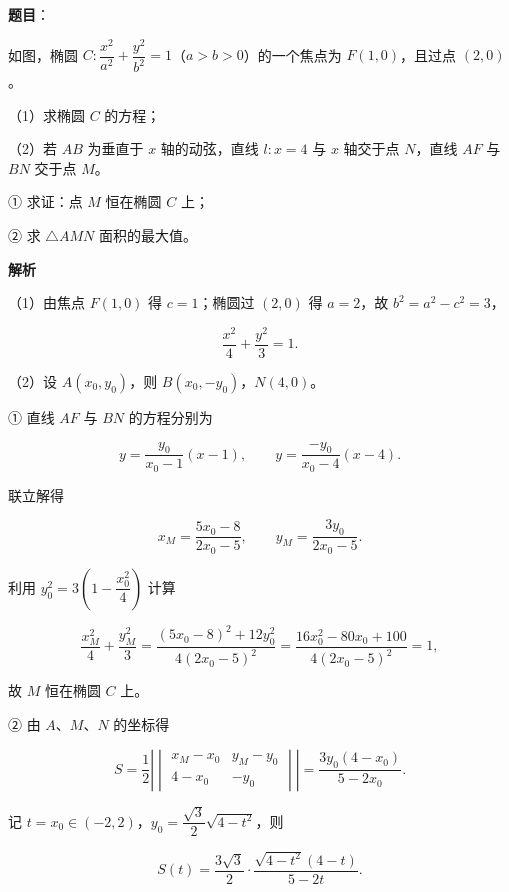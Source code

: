 \begin{answer}

\textbf{题目}：

如图，椭圆 $C:\dfrac{x^2}{a^2}+\dfrac{y^2}{b^2}=1$（$a>b>0$）的一个焦点为 $F(1,0)$，且过点 $(2,0)$。

（1）求椭圆 $C$ 的方程；

（2）若 $AB$ 为垂直于 $x$ 轴的动弦，直线 $l:x=4$ 与 $x$ 轴交于点 $N$，直线 $AF$ 与 $BN$ 交于点 $M$。

① 求证：点 $M$ 恒在椭圆 $C$ 上；

② 求 $\triangle AMN$ 面积的最大值。
\nopagebreak[4]
\begin{center}\end{center}
\nopagebreak[4]
\textbf{解析}

（1）由焦点 $F(1,0)$ 得 $c=1$；椭圆过 $(2,0)$ 得 $a=2$，故 $b^2=a^2-c^2=3$，

\nopagebreak[4]
\[\frac{x^2}4+\frac{y^2}3=1.\]

（2）设 $A(x_0,y_0)$，则 $B(x_0,-y_0)$，$N(4,0)$。

① 直线 $AF$ 与 $BN$ 的方程分别为

\nopagebreak[4]
\[y=\frac{y_0}{x_0-1}(x-1),\qquad y=\frac{-y_0}{x_0-4}(x-4).\]

联立解得

\nopagebreak[4]
\[x_M=\frac{5x_0-8}{2x_0-5},\qquad y_M=\frac{3y_0}{2x_0-5}.\]

利用 $y_0^2=3\left(1-\dfrac{x_0^2}4\right)$ 计算

\nopagebreak[4]
\[\frac{x_M^2}4+\frac{y_M^2}3=\frac{(5x_0-8)^2+12y_0^2}{4(2x_0-5)^2}=\frac{16x_0^2-80x_0+100}{4(2x_0-5)^2}=1,\]

故 $M$ 恒在椭圆 $C$ 上。

② 由 $A$、$M$、$N$ 的坐标得

\nopagebreak[4]
\[S=\frac12\left|\begin{vmatrix}x_M-x_0&y_M-y_0\\ 4-x_0&-y_0\end{vmatrix}\right|=\frac{3y_0(4-x_0)}{5-2x_0}.\]

记 $t=x_0\in(-2,2)$，$y_0=\dfrac{\sqrt3}2\sqrt{4-t^2}$，则

\nopagebreak[4]
\[S(t)=\frac{3\sqrt3}2\cdot\frac{\sqrt{4-t^2}(4-t)}{5-2t}.\]


\end{answer}
